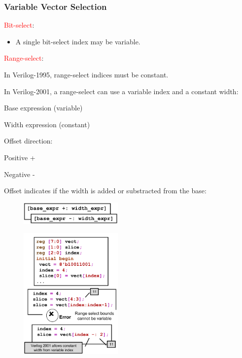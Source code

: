 \documentclass[t, notes, xcolor=table]{beamer}
\begin{document}
\begin{frame}
\frametitle{Variable Vector Selection}
\begin{multicols}{2}
\scriptsize{
\textcolor{red}{Bit-select}:
\begin{itemize}
\item A single bit-select index may be variable.
\end{itemize}

\textcolor{red}{Range-select}:
\begin{itemize}
\item In Verilog-1995, range-select indices must be constant.
\item In Verilog-2001, a range-select can use a variable index and a constant width:
\begin{itemize}
\scriptsize{
	\item Base expression (variable)
	\item Width expression (constant)
	\item Offset direction:
	\begin{itemize}
		\scriptsize{
		\item Positive +
		\item Negative -
		}
	\end{itemize}
	\item Offset indicates if the width is added or substracted from the base:
}
\end{itemize}
\end{itemize}
}
\begin{figure}
    \includegraphics[width=0.45\textwidth]{img/04_offset.png}
\end{figure}
\vfill
\columnbreak

\begin{figure}
    \includegraphics[width=0.45\textwidth]{img/04_selection.png}
\end{figure}
\end{multicols}

\end{frame}
\end{document}
